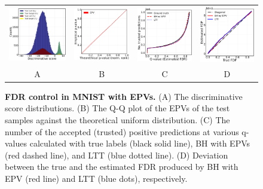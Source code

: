 \documentclass{article}
\begin{document}
\begin{figure}
	\centering
	\begin{tabular}{cccc}
		\includegraphics[width=1.78in]{img/cls_overview.png}&
		\includegraphics[width=1.73in]{img/cnn_QQ_classical.png} &
		\includegraphics[width=1.69in]{img/cnn_classical_fdr_control.png} &
		\includegraphics[width=1.68in]{img/cnn_FDPscat_classical.png} \\
		A & B & C & D \\
	\end{tabular}
	\caption{{\bf FDR control in MNIST with EPVs. } (A) The discriminative score distributions. (B) The Q-Q plot of the EPVs of the test samples against the theoretical uniform distribution. (C) The number of the accepted (trusted) positive predictions at various q-values calculated with true labels (black solid line), BH with EPVs (red dashed line), and LTT (blue dotted line). (D) Deviation between the true and the estimated FDR produced by BH with EPV (red line) and LTT (blue dots), respectively.}
	\label{fig:binary}
\end{figure}
 
\end{document}
